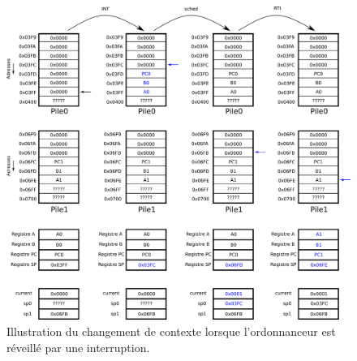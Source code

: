 \begin{figure}[htbp]
\includegraphics[width=\linewidth]{Figs/stack_ordonnanceur.png}
\caption{\label{stack_ordonnanceur} Illustration du changement de contexte lorsque l'ordonnanceur est réveillé par une interruption.}
\end{figure}





